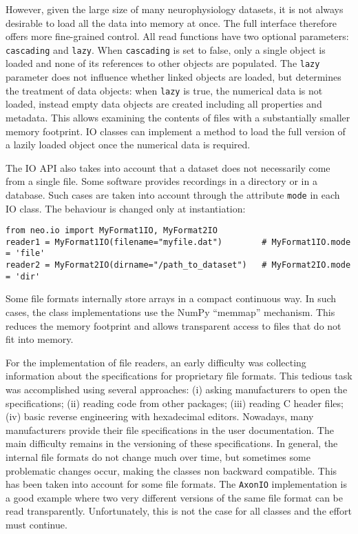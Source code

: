 \documentclass{frontiers}
\begin{document}
However, given the large size of many neurophysiology datasets, it is not always desirable to load all the data into memory at once. The full interface therefore offers more fine-grained control.
All read functions have two optional parameters: \lstinline`cascading` and \lstinline`lazy`.
When \lstinline`cascading` is set to false, only a single object is loaded and none of its references to other objects are populated.
The \lstinline`lazy` parameter does not influence whether linked objects are loaded, but determines the treatment of data objects: when \lstinline`lazy` is true, the numerical data is not loaded, instead empty data objects are created including all properties and metadata. This allows examining the contents of files with a substantially smaller memory footprint. IO classes can implement a method to load the full version of a lazily loaded object once the numerical data is required.

The IO API also takes into account that a dataset does not necessarily come from a single file. Some software provides recordings in a directory or in a database. Such cases are taken into account through the attribute \lstinline`mode` in each IO class. The behaviour is changed only at instantiation:

\begin{lstlisting}[style=display]
from neo.io import MyFormat1IO, MyFormat2IO
reader1 = MyFormat1IO(filename="myfile.dat")        # MyFormat1IO.mode = 'file'
reader2 = MyFormat2IO(dirname="/path_to_dataset")   # MyFormat2IO.mode = 'dir'
\end{lstlisting}

Some file formats internally store arrays in a compact continuous way. In such cases, the class implementations use the NumPy ``memmap'' mechanism. This reduces the memory footprint and allows transparent access to files that do not fit into memory.

For the implementation of file readers, an early difficulty was collecting information about the specifications for proprietary file formats. This tedious task was accomplished using several approaches: (i) asking manufacturers to open the specifications; (ii) reading code from other packages; (iii) reading C header files; (iv) basic reverse engineering with hexadecimal editors. Nowadays, many manufacturers provide their file specifications in the user documentation.
The main difficulty remains in the versioning of these specifications. In general, the internal file formats do not change much over time, but sometimes some problematic changes occur, making the classes non backward compatible. This has been taken into account for some file formats. The \lstinline`AxonIO` implementation is a good example where two very different versions of the same file format can be read transparently. Unfortunately, this is not the case for all classes and the effort must continue.
\end{document}

